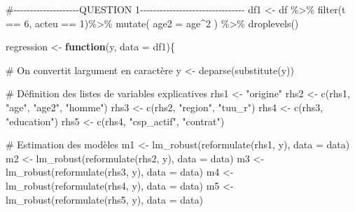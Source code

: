 \documentclass[
  letterpaper,
  DIV=11,
  numbers=noendperiod]{scrartcl}
\newenvironment{Shaded}{\begin{snugshade}}{\end{snugshade}}
\newcommand{\AttributeTok}[1]{\textcolor[rgb]{0.40,0.45,0.13}{#1}}
\newcommand{\CommentTok}[1]{\textcolor[rgb]{0.37,0.37,0.37}{#1}}
\newcommand{\ControlFlowTok}[1]{\textcolor[rgb]{0.00,0.23,0.31}{\textbf{#1}}}
\newcommand{\DecValTok}[1]{\textcolor[rgb]{0.68,0.00,0.00}{#1}}
\newcommand{\FunctionTok}[1]{\textcolor[rgb]{0.28,0.35,0.67}{#1}}
\newcommand{\NormalTok}[1]{\textcolor[rgb]{0.00,0.23,0.31}{#1}}
\newcommand{\OtherTok}[1]{\textcolor[rgb]{0.00,0.23,0.31}{#1}}
\newcommand{\SpecialCharTok}[1]{\textcolor[rgb]{0.37,0.37,0.37}{#1}}
\newcommand{\StringTok}[1]{\textcolor[rgb]{0.13,0.47,0.30}{#1}}
\begin{document}
\begin{Shaded}
\begin{Highlighting}[]
\CommentTok{\#{-}{-}{-}{-}{-}{-}{-}{-}{-}{-}{-}{-}{-}{-}{-}{-}{-}{-}{-}{-}QUESTION 1{-}{-}{-}{-}{-}{-}{-}{-}{-}{-}{-}{-}{-}{-}{-}{-}{-}{-}{-}{-}{-}{-}{-}{-}{-}{-}{-}{-}{-}{-}{-}{-}}
\NormalTok{df1 }\OtherTok{\textless{}{-}}\NormalTok{ df }\SpecialCharTok{\%\textgreater{}\%}
  \FunctionTok{filter}\NormalTok{(t }\SpecialCharTok{==} \DecValTok{6}\NormalTok{, acteu }\SpecialCharTok{==} \DecValTok{1}\NormalTok{)}\SpecialCharTok{\%\textgreater{}\%}
  \FunctionTok{mutate}\NormalTok{(}
    \AttributeTok{age2  =}\NormalTok{ age}\SpecialCharTok{\^{}}\DecValTok{2}
\NormalTok{  ) }\SpecialCharTok{\%\textgreater{}\%}
  \FunctionTok{droplevels}\NormalTok{()}


\NormalTok{regression }\OtherTok{\textless{}{-}} \ControlFlowTok{function}\NormalTok{(y, }\AttributeTok{data =}\NormalTok{ df1)\{}
  
  \CommentTok{\# On convertit l\textquotesingle{}argument en caractère }
\NormalTok{  y }\OtherTok{\textless{}{-}} \FunctionTok{deparse}\NormalTok{(}\FunctionTok{substitute}\NormalTok{(y))}
  
  \CommentTok{\# Définition des listes de variables explicatives}
\NormalTok{  rhs1 }\OtherTok{\textless{}{-}} \StringTok{"origine"}
\NormalTok{  rhs2 }\OtherTok{\textless{}{-}} \FunctionTok{c}\NormalTok{(rhs1, }\StringTok{"age"}\NormalTok{, }\StringTok{"age2"}\NormalTok{, }\StringTok{"homme"}\NormalTok{)}
\NormalTok{  rhs3 }\OtherTok{\textless{}{-}} \FunctionTok{c}\NormalTok{(rhs2, }\StringTok{"region"}\NormalTok{, }\StringTok{"tuu\_r"}\NormalTok{)}
\NormalTok{  rhs4 }\OtherTok{\textless{}{-}} \FunctionTok{c}\NormalTok{(rhs3, }\StringTok{"education"}\NormalTok{)}
\NormalTok{  rhs5 }\OtherTok{\textless{}{-}} \FunctionTok{c}\NormalTok{(rhs4, }\StringTok{"csp\_actif"}\NormalTok{, }\StringTok{"contrat"}\NormalTok{)}
  
  \CommentTok{\# Estimation des modèles}
\NormalTok{  m1 }\OtherTok{\textless{}{-}} \FunctionTok{lm\_robust}\NormalTok{(}\FunctionTok{reformulate}\NormalTok{(rhs1, y), }\AttributeTok{data =}\NormalTok{ data)}
\NormalTok{  m2 }\OtherTok{\textless{}{-}} \FunctionTok{lm\_robust}\NormalTok{(}\FunctionTok{reformulate}\NormalTok{(rhs2, y), }\AttributeTok{data =}\NormalTok{ data)}
\NormalTok{  m3 }\OtherTok{\textless{}{-}} \FunctionTok{lm\_robust}\NormalTok{(}\FunctionTok{reformulate}\NormalTok{(rhs3, y), }\AttributeTok{data =}\NormalTok{ data)}
\NormalTok{  m4 }\OtherTok{\textless{}{-}} \FunctionTok{lm\_robust}\NormalTok{(}\FunctionTok{reformulate}\NormalTok{(rhs4, y), }\AttributeTok{data =}\NormalTok{ data)}
\NormalTok{  m5 }\OtherTok{\textless{}{-}} \FunctionTok{lm\_robust}\NormalTok{(}\FunctionTok{reformulate}\NormalTok{(rhs5, y), }\AttributeTok{data =}\NormalTok{ data)}
  

\end{Highlighting}
\end{Shaded}
\end{document}
